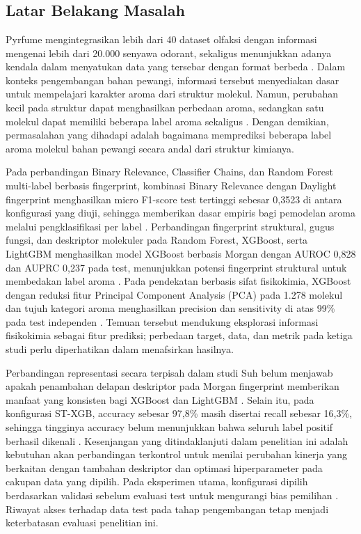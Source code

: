 \chapter{\babSatu}

\section{Latar Belakang Masalah}

Pyrfume mengintegrasikan lebih dari 40 dataset olfaksi dengan informasi mengenai lebih dari 20.000 senyawa odorant, sekaligus menunjukkan adanya kendala dalam menyatukan data yang tersebar dengan format berbeda \cite{hamel2024}. Dalam konteks pengembangan bahan pewangi, informasi tersebut menyediakan dasar untuk mempelajari karakter aroma dari struktur molekul. Namun, perubahan kecil pada struktur dapat menghasilkan perbedaan aroma, sedangkan satu molekul dapat memiliki beberapa label aroma sekaligus \cite{saini2022}. Dengan demikian, permasalahan yang dihadapi adalah bagaimana memprediksi beberapa label aroma molekul bahan pewangi secara andal dari struktur kimianya.

Pada perbandingan Binary Relevance, Classifier Chains, dan Random Forest multi-label berbasis fingerprint, kombinasi Binary Relevance dengan Daylight fingerprint menghasilkan micro F1-score test tertinggi sebesar 0,3523 di antara konfigurasi yang diuji, sehingga memberikan dasar empiris bagi pemodelan aroma melalui pengklasifikasi per label \cite{saini2022}. Perbandingan fingerprint struktural, gugus fungsi, dan deskriptor molekuler pada Random Forest, XGBoost, serta LightGBM menghasilkan model XGBoost berbasis Morgan dengan AUROC 0,828 dan AUPRC 0,237 pada test, menunjukkan potensi fingerprint struktural untuk membedakan label aroma \cite{suh2025}. Pada pendekatan berbasis sifat fisikokimia, XGBoost dengan reduksi fitur Principal Component Analysis (PCA) pada 1.278 molekul dan tujuh kategori aroma menghasilkan precision dan sensitivity di atas 99\% pada test independen \cite{tyagi2024}. Temuan tersebut mendukung eksplorasi informasi fisikokimia sebagai fitur prediksi; perbedaan target, data, dan metrik pada ketiga studi perlu diperhatikan dalam menafsirkan hasilnya.

Perbandingan representasi secara terpisah dalam studi Suh belum menjawab apakah penambahan delapan deskriptor pada Morgan fingerprint memberikan manfaat yang konsisten bagi XGBoost dan LightGBM \cite{suh2025}. Selain itu, pada konfigurasi ST-XGB, accuracy sebesar 97,8\% masih disertai recall sebesar 16,3\%, sehingga tingginya accuracy belum menunjukkan bahwa seluruh label positif berhasil dikenali \cite{suh2025}. Kesenjangan yang ditindaklanjuti dalam penelitian ini adalah kebutuhan akan perbandingan terkontrol untuk menilai perubahan kinerja yang berkaitan dengan tambahan deskriptor dan optimasi hiperparameter pada cakupan data yang dipilih. Pada eksperimen utama, konfigurasi dipilih berdasarkan validasi sebelum evaluasi test untuk mengurangi bias pemilihan \cite{cawley2010}. Riwayat akses terhadap data test pada tahap pengembangan tetap menjadi keterbatasan evaluasi penelitian ini.

